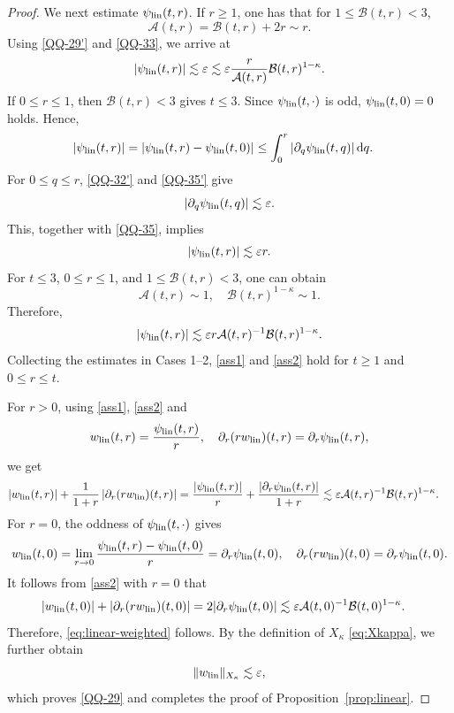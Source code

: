 \documentclass[11pt,twoside]{article}
\newcommand{\p}{\partial}
\newcommand{\ve}{\varepsilon}
\newcommand{\f}{\frac}
\newcommand{\Acal}{\mathcal A}
\newcommand{\Bcal}{\mathcal B}
\newcommand{\dd}{\,\mathrm{d}}
\theoremstyle{plain}
\theoremstyle{definition}
\theoremstyle{remark}
\numberwithin{equation}{section}
\begin{document}
\begin{proof}
We next estimate $\psi_{\rm lin}(t,r)$. If
$r\geq1$, one has that for $1\leq\Bcal(t,r)<3$,
\[
\Acal(t,r)=\Bcal(t,r)+2r\sim r.
\]
Using \eqref{QQ-29'} and \eqref{QQ-33}, we arrive at
\[
|\psi_{\rm lin}(t,r)|
\lesssim
\ve
\lesssim
\ve\f{r}{\Acal(t,r)}\Bcal(t,r)^{1-\kappa}.
\]
If $0\leq r\leq1$, then $\Bcal(t,r)<3$ gives $t\leq3$.
Since $\psi_{\rm lin}(t,\cdot)$ is odd, $\psi_{\rm lin}(t,0)=0$ holds.
Hence,
\begin{equation}\label{QQ-35}
\begin{aligned}
|\psi_{\rm lin}(t,r)|
&=
\left|
\psi_{\rm lin}(t,r)-\psi_{\rm lin}(t,0)
\right|\leq
\int_0^r
|\p_q\psi_{\rm lin}(t,q)|\dd q.
\end{aligned}
\end{equation}
For $0\leq q\leq r$,  \eqref{QQ-32'} and \eqref{QQ-35'} give
\[
|\p_q\psi_{\rm lin}(t,q)|
\lesssim
\ve.
\]
This, together with \eqref{QQ-35}, implies
\[
|\psi_{\rm lin}(t,r)|
\lesssim
\ve r.
\]
For $t\leq3$, $0\leq r\leq1$, and
$1\leq\Bcal(t,r)<3$, one can obtain
\[
\Acal(t,r)\sim1,
\quad
\Bcal(t,r)^{1-\kappa}\sim1.
\]
Therefore,
\[
|\psi_{\rm lin}(t,r)|
\lesssim
\ve r\Acal(t,r)^{-1}\Bcal(t,r)^{1-\kappa}.
\]
Collecting the estimates in Cases 1--2, \eqref{ass1} and
\eqref{ass2} hold for $t\geq1$ and $0\leq r\leq t$.

For $r>0$,
using \eqref{ass1},
\eqref{ass2} and
\[
w_{\rm lin}(t,r)=\f{\psi_{\rm lin}(t,r)}{r},
\quad
\p_r(rw_{\rm lin})(t,r)=\p_r\psi_{\rm lin}(t,r),
\]
we get
\[
\begin{aligned}
|w_{\rm lin}(t,r)|
+
\f{1}{1+r}
\left|
\p_r(rw_{\rm lin})(t,r)
\right|
&=
\f{|\psi_{\rm lin}(t,r)|}{r}
+
\f{|\p_r\psi_{\rm lin}(t,r)|}{1+r}\lesssim
\ve\Acal(t,r)^{-1}\Bcal(t,r)^{1-\kappa}.
\end{aligned}
\]
For $r=0$, the oddness of $\psi_{\rm lin}(t,\cdot)$ gives
\[
w_{\rm lin}(t,0)=
\lim_{r\to0}
\f{\psi_{\rm lin}(t,r)-\psi_{\rm lin}(t,0)}{r}=\p_r\psi_{\rm lin}(t,0),
\quad
\p_r(rw_{\rm lin})(t,0)=\p_r\psi_{\rm lin}(t,0).
\]
It follows from \eqref{ass2} with $r=0$ that
\[
\begin{aligned}
|w_{\rm lin}(t,0)|
+
\left|
\p_r(rw_{\rm lin})(t,0)
\right|
&=
2|\p_r\psi_{\rm lin}(t,0)|\lesssim
\ve\Acal(t,0)^{-1}\Bcal(t,0)^{1-\kappa}.
\end{aligned}
\]
Therefore, \eqref{eq:linear-weighted} follows. By the definition of
$X_\kappa$ \eqref{eq:Xkappa}, we further obtain
\[
\|w_{\rm lin}\|_{X_\kappa}\lesssim\ve,
\]
which proves \eqref{QQ-29} and completes the proof of
Proposition~\ref{prop:linear}.
\end{proof}
\end{document}
